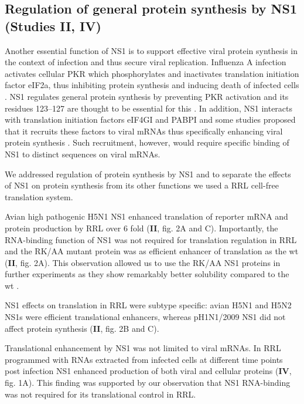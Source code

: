						
	\subsection{Regulation of general protein synthesis by NS1 (Studies II, IV)}
	
		Another essential function of NS1 is to support effective viral protein synthesis in the context of infection and thus secure viral replication. Influenza A infection activates cellular \gls{PKR} which phosphorylates and inactivates translation initiation factor \gls{eIF2a}, thus inhibiting protein synthesis and inducing death of infected cells \parencite{Levin1978}. NS1 regulates general protein synthesis by preventing  \gls{PKR} activation and its residues 123--127 are thought to be essential for this \parencite{Lu1995, Min2007}. In addition, NS1 interacts with translation initiation factors \gls{eIF4GI} and \gls{PABP}I and some studies proposed that it recruits these factors to viral mRNAs thus specifically enhancing viral protein synthesis \parencite{DelaLuna1995, Aragon2000, Burgui2003}. Such recruitment, however, would require specific binding of NS1 to distinct sequences on viral mRNAs.
		
		We addressed regulation of protein synthesis by NS1 and to separate the effects of NS1 on protein synthesis from its other functions we used a \gls{RRL} cell-free translation system. 
		
		Avian high pathogenic H5N1 NS1 enhanced translation of reporter mRNA and protein production by \gls{RRL} over 6 fold (\textbf{II}, fig. 2A and C). Importantly, the RNA-binding function of NS1 was not required for translation regulation in \gls{RRL} and the RK/AA mutant protein was as efficient enhancer of translation as the \gls{wt} (\textbf{II}, fig. 2A). This observation allowed us to use the RK/AA NS1 proteins in further experiments as they show remarkably better solubility compared to the \gls{wt} \parencite{Bornholdt2008}. 
		
		NS1 effects on translation in \gls{RRL} were subtype specific: avian H5N1 and H5N2 NS1s were efficient translational enhancers, whereas pH1N1/2009 NS1 did not affect protein synthesis (\textbf{II}, fig. 2B and C). 
		
		Translational enhancement by NS1 was not limited to viral mRNAs. In \gls{RRL} programmed with RNAs extracted from infected cells at different time points post infection NS1 enhanced production of both viral and cellular proteins (\textbf{IV}, fig. 1A). This finding was supported by  our observation that NS1 RNA-binding was not required for its translational control in \gls{RRL}. 
		

